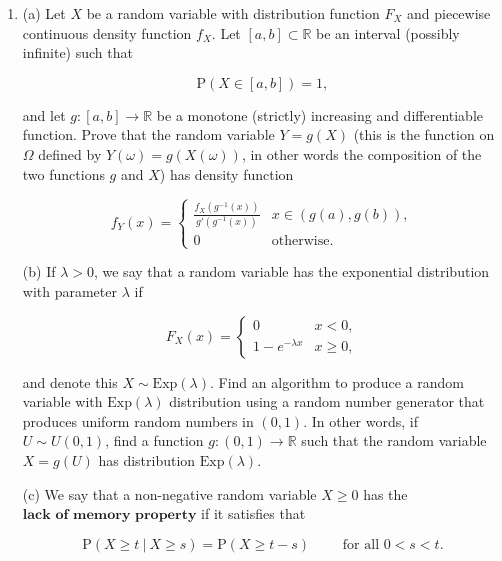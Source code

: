 \documentclass[11pt]{report}
\providecommand{\cal}{\mathcal}
\newcommand{\R}{\mathbb{R}}
\theoremstyle{plain}
\theoremstyle{definition}
\begin{document}
\begin{enumerate}[label=\arabic*.]
The $\sigma$-algebra $\sigma({\cal A})$ is called the $\textbf{$\sigma$-algebra generated by } {\cal A}$.

$\textbf{Hint for (b).}$ Let $({\cal F}_i)_{i\in I}$ be the collection of all $\sigma$-algebras of subsets of $\Omega$ that contain ${\cal A}$. This is a non-empty collection, since it contains for example ${\cal P}(\Omega)$, the set of all subsets of $\Omega$. Any $\sigma$-algebra $\sigma({\cal A})$ that satisfies the two properties above is necessarily a subset of any of the ${\cal F}_i$'s, hence it is also contained in the intersection of all the ${\cal F}_i$'s, which is a $\sigma$-algebra by part (a) of the question.
\item (a) Let $X$ be a random variable with distribution function $F_X$ and piecewise continuous density function $f_X$. Let $[a,b] \subset \R$ be an interval (possibly infinite) such that

\[
\mathrm{P}(X \in [a,b]) = 1,
\]

and let $g:[a,b]\to\R$ be a monotone (strictly) increasing and differentiable function. Prove that the random variable $Y=g(X)$
(this is the function on $\Omega$ defined by $Y(\omega) = g(X(\omega))$, in other words the composition of the two functions $g$ and $X$) has density function

\[
f_Y(x) = \begin{cases} \frac{f_X(g^{-1}(x))}{g'(g^{-1}(x))} & x\in (g(a),g(b)), \\ 0 & \textrm{otherwise.} \end{cases}
\]

(b) If $\lambda>0$, we say that a random variable has the exponential distribution with parameter $\lambda$ if

\[
F_X(x) = \begin{cases} 0 & x<0, \\ 1-e^{-\lambda x} & x \ge 0, \end{cases}
\]

and denote this $X \sim \textrm{Exp}(\lambda).$
Find an algorithm to produce a random variable with $\textrm{Exp}(\lambda)$ distribution using a random number generator that produces uniform random numbers in $(0,1)$. In other words, if $U \sim U(0,1)$, find a function $g:(0,1)\to\R$ such that the random variable $X=g(U)$ has distribution $\textrm{Exp}(\lambda)$.

(c) We say that a non-negative random variable $X\ge 0$ has the $\textbf{lack of memory property}$ if it satisfies that

\[
\mathrm{P}(X \ge t\ |\ X \ge s) = \mathrm{P}(X \ge t-s)\qquad \textrm{ for all $0<s<t$}.
\]


\end{enumerate}
\end{document}
